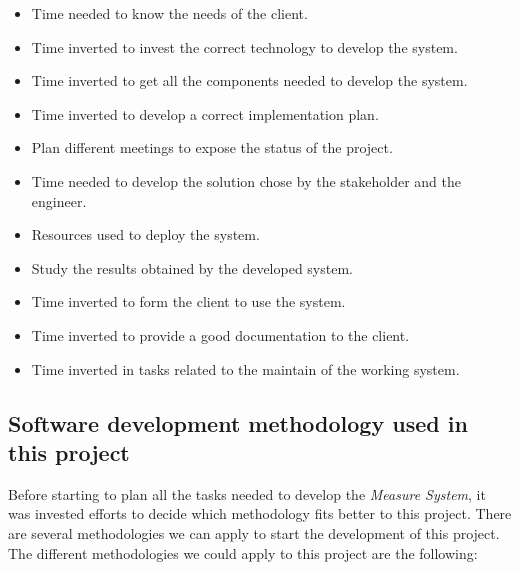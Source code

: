 \begin{itemize}
\item Time needed to know the needs of the client.
\item Time inverted to invest the correct technology to develop the system.
\item Time inverted to get all the components needed to develop the system.
\item Time inverted to develop a correct implementation plan.
\item Plan different meetings to expose the status of the project.
\item Time needed to develop the solution chose by the stakeholder and the engineer.
\item Resources used to deploy the system.
\item Study the results obtained by the developed system.
\item Time inverted to form the client to use the system.
\item Time inverted to provide a good documentation to the client.
\item Time inverted in tasks related to the maintain of the working system.
\end{itemize}

\subsection{Software development methodology used in this project}

Before starting to plan all the tasks needed to develop the \textit{Measure System}, it was invested efforts to decide which methodology fits better to this project. There are several methodologies we can apply to start the development of this project. The different methodologies we could apply to this project are the following:


